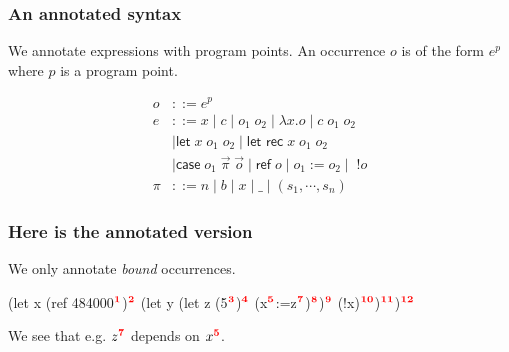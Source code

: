 \documentclass[aspectratio=169]{beamer}
\begin{document}
\begin{frame}
  \frametitle{An annotated syntax}

  We annotate expressions with program points. An occurrence $o$ is of the form $e^p$ where $p$ is a program point.
  
\begin{align*}
o &::= e^p \\
e &::= x \mid c \mid o_1\;o_2 \mid \lambda x.o \mid c \; o_1 \; o_2\\
			& \mid \textsf{let} \; x \; o_1 \; o_2 \mid
                   \textsf{let rec} \; x \; o_1 \; o_2 \\
  & \mid \textsf{case}
                   \; o_1 \; \vec{\pi} \; \vec{o} \mid  \textsf{ref} \; o \mid o_1 := o_2 \mid \; !o\\
\pi &::= n \mid b \mid x \mid \_  \mid
                                (s_1,\cdots,s_n)
\end{align*}

\end{frame}
\begin{frame}[fragile]
  \frametitle{Here is the annotated version}

    We only annotate \emph{bound} occurrences.

  \begin{rescript}
   (let x (ref 484000$\mathbf{\textcolor{red}{^{1}}}$)$\mathbf{\textcolor{red}{^{2}}}$
     (let y (let z (5$\mathbf{\textcolor{red}{^{3}}}$)$\mathbf{\textcolor{red}{^{4}}}$
        (x$\mathbf{\textcolor{red}{^{5}}}$:=z$\mathbf{\textcolor{red}{^{7}}}$)$\mathbf{\textcolor{red}{^{8}}}$)$\mathbf{\textcolor{red}{^{9}}}$ (!x)$\mathbf{\textcolor{red}{^{10}}}$)$\mathbf{\textcolor{red}{^{11}}}$)$\mathbf{\textcolor{red}{^{12}}}$
\end{rescript}

We see that e.g. $z\mathbf{\textcolor{red}{^{7}}}$ depends on $x\mathbf{\textcolor{red}{^{5}}}$.

\end{frame}

  \newcommand{\desc}[2]{\ensuremath{\underbrace{#1}_{\text{\tiny{#2}}}}}
\end{document}
